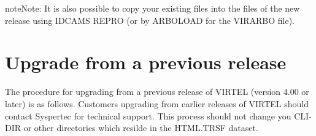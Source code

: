 \documentclass[letterpaper,10pt,english]{sphinxmanual}
\begin{document}
\begin{sphinxVerbatim}[commandchars=\\\{\}]
\end{sphinxVerbatim}


\begin{sphinxadmonition}{note}{Note:}
It is also possible to copy your existing files into the files of the new release using IDCAMS REPRO (or by ARBOLOAD for the VIRARBO file).
\end{sphinxadmonition}


\section{Upgrade from a previous release}
\label{\detokenize{Installation_Guide:upgrade-from-a-previous-release}}\label{\detokenize{Installation_Guide:index-6}}
The procedure for upgrading from a previous release of VIRTEL (version 4.00 or later) is as follows. Customers upgrading from  earlier releases of VIRTEL should contact Syspertec for technical support. This process should not change you CLI-DIR or other directories which resilde in the HTML.TRSF dataset.
\end{document}
